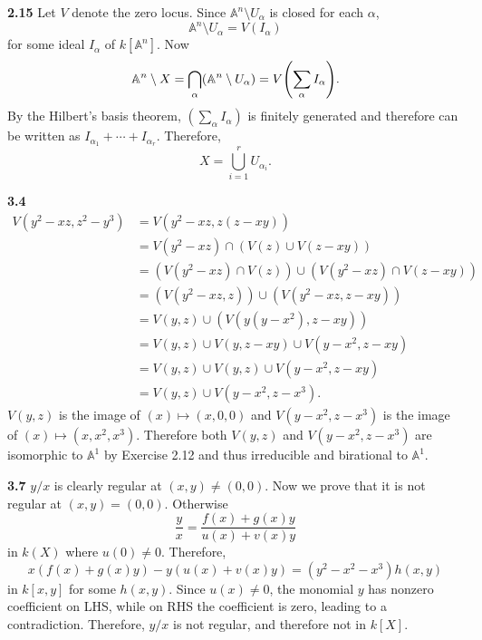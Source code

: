 \documentclass{article}
\makeatletter
\newcommand*{\shifttext}[1]{%
  \settowidth{\@tempdima}{#1}%
  \hspace{-\@tempdima}#1%
}
\newcommand{\plabel}[1]{%
\shifttext{\textbf{#1}\quad}%
}
\newcommand{\prule}{%
\begin{center}%
\hdashrule[0.5ex]{.99\linewidth}{1pt}{1pt 2.5pt}%
\end{center}%
}
\newcommand{\minusbaseline}{\abovedisplayskip=0pt\abovedisplayshortskip=0pt~\vspace*{-\baselineskip}}%
\makeatother
\begin{document}
\plabel{2.15}%
Let $V$ denote the zero locus.
Since $\mathbb{A}^n \setminus U_\alpha$ is closed for each $\alpha$,
\[ \mathbb{A}^n \setminus U_\alpha = V(I_\alpha) \]
for some ideal $I_\alpha$ of $k[\mathbb{A}^n]$.
Now 
\[ \mathbb{A}^n \setminus X = \bigcap_\alpha (\mathbb{A}^n \setminus U_\alpha) = V\qty(\sum_\alpha I_\alpha). \]
By the Hilbert's basis theorem, $(\sum_\alpha I_\alpha)$ is finitely generated and therefore can be written as $I_{\alpha_1} + \cdots + I_{\alpha_r}$.
Therefore,
\[ X = \bigcup_{i=1}^r U_{\alpha_i}. \]

\prule

\plabel{3.4}%
\begingroup\minusbaseline
\begin{align*}
    V(y^2-xz, z^2-y^3) &= V(y^2-xz, z(z-xy)) \\
    &= V(y^2 - xz) \cap (V(z) \cup V(z-xy)) \\
    &= (V(y^2 - xz) \cap V(z)) \cup (V(y^2 - xz) \cap V(z-xy)) \\
    &= (V(y^2 - xz, z)) \cup (V(y^2 - xz, z-xy)) \\
    &= V(y,z) \cup (V(y(y - x^2), z-xy)) \\
    &= V(y,z) \cup V(y, z-xy) \cup V(y - x^2, z-xy) \\
    &= V(y,z) \cup V(y, z) \cup V(y - x^2, z-xy) \\
    &= V(y,z) \cup V(y - x^2, z-x^3).
\end{align*}
\endgroup
$V(y,z)$ is the image of $(x) \mapsto (x,0,0)$ and $V(y - x^2, z-x^3)$ is the image of $(x) \mapsto (x,x^2,x^3)$.
Therefore both $V(y,z)$ and $V(y - x^2, z-x^3)$ are isomorphic to $\mathbb{A}^1$ by Exercise 2.12 and thus irreducible and birational to $\mathbb{A}^1$.

\plabel{3.7}%
$y/x$ is clearly regular at $(x,y) \neq (0,0)$.
Now we prove that it is not regular at $(x,y) = (0,0)$.
Otherwise
\[ \frac{y}{x} = \frac{f(x) + g(x)y}{u(x) + v(x)y} \]
in $k(X)$ where $u(0) \neq 0$.
Therefore,
\[ x(f(x) + g(x)y) - y(u(x) + v(x)y) = (y^2 - x^2 - x^3) h(x,y) \]
in $k[x,y]$ for some $h(x,y)$.
Since $u(x) \neq 0$, the monomial $y$ has nonzero coefficient on LHS, while on RHS the coefficient is zero, leading to a contradiction.
Therefore, $y/x$ is not regular, and therefore not in $k[X]$.
\end{document}
